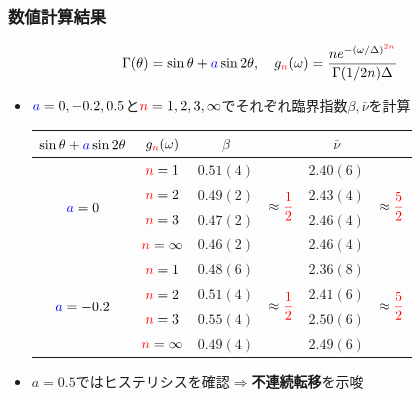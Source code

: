 \begin{frame}\frametitle{数値計算結果}
  \begin{align*}
    \Gamma(\theta)=\sin\theta+{\color{blue}a}\sin2\theta,\quad
    g_{\color{red}n}(\omega)=\dfrac{ne^{-(\omega/\Delta)^{\color{red}2n}}}{\Gamma(1/2n)\Delta}
  \end{align*}
  \begin{itemize}
    \item ${\color{blue}a}=0,-0.2,0.5$と$\textcolor{red}{n}=1,2,3,\infty$でそれぞれ臨界指数$\beta,\bar{\nu}$を計算
    \begin{table}[thbp]
      \begin{center}
        \begin{tabu}{cc|cccc}\hline
          $\sin\theta+\textcolor{blue}{a}\sin2\theta$ & $g_{{\color{red}n}}(\omega)$ & $\beta$ & & $\bar{\nu}$ &\\\hline\hline
           & $\textcolor{red}{n}=1$ & $0.51(4)$ &  & $2.40(6)$ & \\
           & $\textcolor{red}{n}=2$ & $0.49(2)$ & & $2.43(4)$ &\\
           & $\textcolor{red}{n}=3$ & $0.47(2)$ & & $2.46(4)$ &\\
           & $\textcolor{red}{n}=\infty$ & $0.46(2)$ & & $2.46(4)$ &\\\hline
            & $\textcolor{red}{n}=1$ & $0.48(6)$ &  & $2.36(8)$ & \\
           & $\textcolor{red}{n}=2$ & $0.51(4)$ & & $2.41(6)$ & \\
           & $\textcolor{red}{n}=3$ & $0.55(4)$ & & $2.50(6)$ &\\
           & $\textcolor{red}{n}=\infty$ & $0.49(4)$ & & $2.49(6)$ &\\\hline
        \end{tabu}
      \end{center}
    \end{table}
    \item $a=0.5$ではヒステリシスを確認$\Longrightarrow$\textbf{不連続転移}を示唆
  \end{itemize}
\end{frame}

